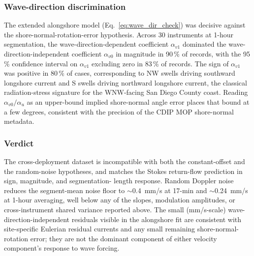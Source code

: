 \subsubsection{Wave-direction discrimination}
The extended alongshore model
(Eq.~\eqref{eq:wave_dir_check}) was decisive against the
shore-normal-rotation-error hypothesis. Across 30 instruments at
1-hour segmentation, the wave-direction-dependent coefficient
$\alpha_{v1}$ dominated the wave-direction-independent coefficient
$\alpha_{v0}$ in magnitude in 90\,\% of records, with the 95\,\%
confidence interval on $\alpha_{v1}$ excluding zero in 83\,\% of
records. The sign of $\alpha_{v1}$ was positive in 80\,\% of cases,
corresponding to NW swells driving southward longshore current and
S swells driving northward longshore current, the classical
radiation-stress signature for the WNW-facing San Diego County
coast. Reading $\alpha_{v0}/\alpha_u$ as an upper-bound implied
shore-normal angle error places that bound at a few degrees,
consistent with the precision of the CDIP MOP shore-normal
metadata.

\subsubsection{Verdict}
The cross-deployment dataset is incompatible with both the
constant-offset and the random-noise hypotheses, and matches the
Stokes return-flow prediction in sign, magnitude, and segmentation-
length response. Random Doppler noise reduces the segment-mean
noise floor to $\sim$0.4~mm/s at 17-min and $\sim$0.24~mm/s at
1-hour averaging, well below any of the slopes, modulation
amplitudes, or cross-instrument shared variance reported above. The
small (mm/s-scale) wave-direction-independent residuals visible in
the alongshore fit are consistent with site-specific Eulerian
residual currents and any small remaining shore-normal-rotation
error; they are not the dominant component of either velocity
component's response to wave forcing.

